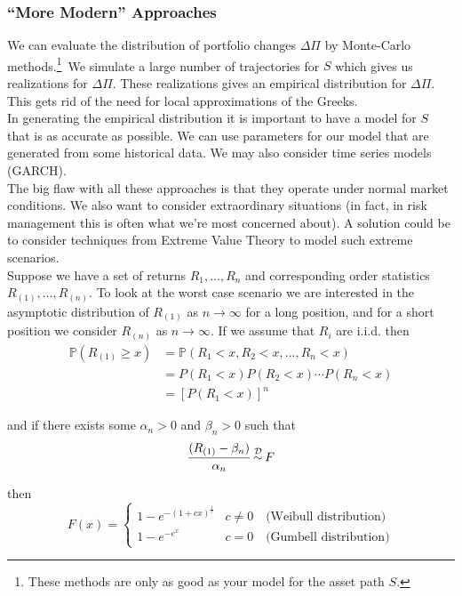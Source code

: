 \documentclass[12pt]{article}
\newlength\tindent
\renewcommand{\indent}{\hspace*{\tindent}}
\renewcommand{\P}{\mathbb P}
\newcommand{\indist}{\,{\buildrel \mathcal D \over \sim}\,}
\begin{document}
\subsubsection{``More Modern'' Approaches}

\indent We can evaluate the distribution of portfolio changes $\Delta \Pi$ by Monte-Carlo methods.\footnote{These methods are only as good as your model for the asset path $S$.}~We simulate a large number of trajectories for $S$ which gives us realizations for $\Delta \Pi$. These realizations gives an empirical distribution for $\Delta \Pi$. This gets rid of the need for local approximations of the Greeks. \\

\indent In generating the empirical distribution it is important to have a model for $S$ that is as accurate as possible. We can use parameters for our model that are generated from some historical data. We may also consider time series models (GARCH). \\

\indent The big flaw with all these approaches is that they operate under normal market conditions. We also want to consider extraordinary situations (in fact, in risk management this is often what we're most concerned about). A solution could be to consider techniques from Extreme Value Theory to model such extreme scenarios. \\

Suppose we have a set of returns $R_1,..., R_n$ and corresponding order statistics $R_{(1)},...,R_{(n)}$. To look at the worst case scenario we are interested in the asymptotic distribution of $R_{(1)}$ as $n\to\infty$ for a long position, and for a short position we consider $R_{(n)}$ as $n\to\infty$. If we assume that $R_i$ are i.i.d. then
\begin{align*}
	\P ( R_{(1)} \geq x ) &= \P ( R_1 < x, R_2 < x, ..., R_n < x) \\
	&= P(R_1 < x)P(R_2 < x) \cdots P(R_n < x) \\
	&= \left[ P(R_1 < x) \right]^n
\end{align*}

and if there exists some $\alpha_n > 0$ and $\beta_n > 0$ such that
\begin{equation*}
	\frac{ (R_{(1)} - \beta_n) }{ \alpha_n } \indist F
\end{equation*}

then
\begin{equation*}
	F(x) = 
	\begin{cases}
		1 - e^{-(1 + cx)^\frac{1}{c}} & c \neq 0 \quad \text{(Weibull distribution)} \\
		1 - e^{-e^x} & c = 0 \quad \text{(Gumbell distribution)}
	\end{cases}
\end{equation*}
\end{document}
